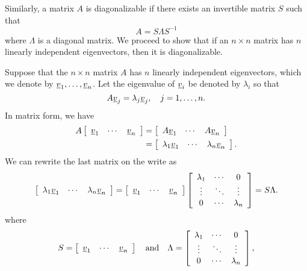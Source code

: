 Similarly, a matrix $A$ is diagonalizable if there exists an invertible matrix $S$ such that
\begin{equation*}
A = S \Lambda S^{-1}
\end{equation*}
where $\Lambda$ is a diagonal matrix.
We proceed to show that if an $n \times n$ matrix has $n$ linearly independent eigenvectors, then it is diagonalizable.

Suppose that the $n \times n$ matrix $A$ has $n$ linearly independent eigenvectors, which we denote by $\underline{v}_1, \ldots, \underline{v}_n$.
Let the eigenvalue of $\underline{v}_i$ be denoted by $\lambda_i$ so that
\begin{equation*}
A \underline{v}_j = \lambda_j \underline{v}_j, \quad j = 1, \ldots, n.
\end{equation*}
In matrix form, we have
\begin{equation*}
\begin{split}
A \left[ \begin{array}{ccc} \underline{v}_1 & \cdots & \underline{v}_n \end{array} \right]
&= \left[ \begin{array}{ccc} A \underline{v}_1 & \cdots & A \underline{v}_n \end{array} \right] \\
&= \left[ \begin{array}{ccc} \lambda_1 \underline{v}_1 & \cdots & \lambda_n \underline{v}_n \end{array} \right] .
\end{split}
\end{equation*}
We can rewrite the last matrix on the write as
\begin{equation*}
\left[ \begin{array}{ccc} \lambda_1 \underline{v}_1 & \cdots & \lambda_n \underline{v}_n \end{array} \right]
= \left[ \begin{array}{ccc} \underline{v}_1 & \cdots & \underline{v}_n \end{array} \right]
\left[ \begin{array}{ccc}
\lambda_1 & \cdots & 0 \\
\vdots & \ddots & \vdots \\
0 & \cdots & \lambda_n
\end{array} \right]
= S \Lambda .
\end{equation*}
where
\begin{equation*}
S = \left[ \begin{array}{ccc} \underline{v}_1 & \cdots & \underline{v}_n \end{array} \right]
\quad \text{and} \quad
\Lambda = \left[ \begin{array}{ccc}
\lambda_1 & \cdots & 0 \\
\vdots & \ddots & \vdots \\
0 & \cdots & \lambda_n
\end{array} \right] ,
\end{equation*}
